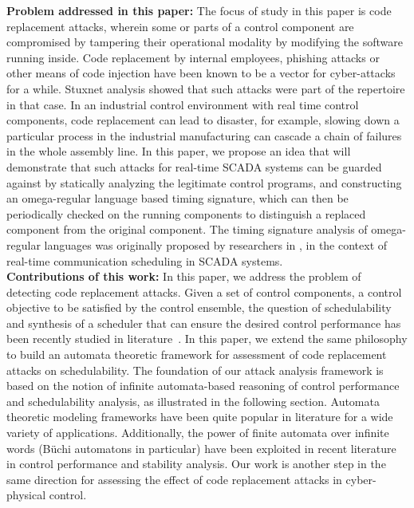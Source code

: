 \noindent
{\bf Problem addressed in this paper:} The focus of study in this paper is code replacement attacks, wherein some or parts of a control component 
are compromised by tampering their operational modality 
by modifying the software running inside. 
Code replacement \cite{GhoshHD12} by internal employees, phishing attacks or other means of code injection
have been known to be a vector for cyber-attacks for a while. Stuxnet analysis showed that such
attacks were part of the repertoire in that case. In an industrial control environment with real time control components, code replacement can lead to disaster, for example, slowing down a
particular process in the industrial manufacturing can cascade a chain of failures in the whole
assembly line. In this paper, we propose an idea that will demonstrate that such
attacks for real-time SCADA systems can be guarded against by statically analyzing the
legitimate control programs, and constructing an omega-regular language based timing signature,
which can then be periodically checked on the running components to distinguish a replaced
component from the original component. The timing signature analysis of omega-regular languages was originally proposed by researchers in \cite{WeissFAA09}, in the context of real-time communication scheduling
in SCADA systems. \\

\noindent
{\bf Contributions of this work:}
In this paper, we address the problem of detecting code replacement attacks. Given a set of control components, a control objective 
to be satisfied by the control ensemble, the question of schedulability and 
synthesis of a scheduler that can ensure the desired control performance has been recently studied in literature~\cite{WeissFAA09, AlurW08, GhoshMDHD16}. 
In this paper, we extend the same philosophy to build an automata theoretic framework for assessment of code replacement attacks on schedulability. The foundation of our attack analysis framework is based on the notion of infinite automata-based reasoning of control performance and schedulability analysis, as illustrated in the following section. Automata theoretic modeling frameworks have been quite popular in literature for a wide variety of applications. Additionally, the power of finite automata over infinite words (B\"{u}chi automatons in particular) have been exploited in recent literature in control performance and stability analysis. Our work is another step in the same direction for assessing the effect of code replacement attacks in cyber-physical control. \\

